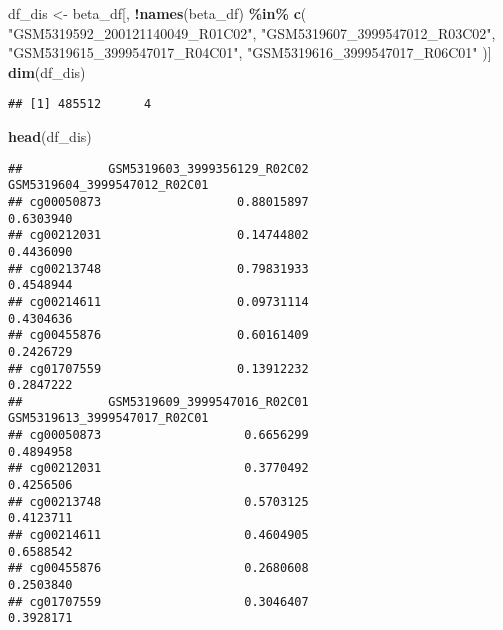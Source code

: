 \documentclass[
]{article}
\newenvironment{Shaded}{\begin{snugshade}}{\end{snugshade}}
\newcommand{\FunctionTok}[1]{\textcolor[rgb]{0.13,0.29,0.53}{\textbf{#1}}}
\newcommand{\NormalTok}[1]{#1}
\newcommand{\OtherTok}[1]{\textcolor[rgb]{0.56,0.35,0.01}{#1}}
\newcommand{\SpecialCharTok}[1]{\textcolor[rgb]{0.81,0.36,0.00}{\textbf{#1}}}
\newcommand{\StringTok}[1]{\textcolor[rgb]{0.31,0.60,0.02}{#1}}
\begin{document}
\begin{Shaded}
\begin{Highlighting}[]
\NormalTok{df\_dis }\OtherTok{\textless{}{-}}\NormalTok{ beta\_df[, }\SpecialCharTok{!}\FunctionTok{names}\NormalTok{(beta\_df) }\SpecialCharTok{\%in\%} \FunctionTok{c}\NormalTok{(}
  \StringTok{"GSM5319592\_200121140049\_R01C02"}\NormalTok{,}
  \StringTok{"GSM5319607\_3999547012\_R03C02"}\NormalTok{,}
  \StringTok{"GSM5319615\_3999547017\_R04C01"}\NormalTok{,}
  \StringTok{"GSM5319616\_3999547017\_R06C01"}
\NormalTok{)]}
\FunctionTok{dim}\NormalTok{(df\_dis)}
\end{Highlighting}
\end{Shaded}

\begin{verbatim}
## [1] 485512      4
\end{verbatim}

\begin{Shaded}
\begin{Highlighting}[]
\FunctionTok{head}\NormalTok{(df\_dis)}
\end{Highlighting}
\end{Shaded}

\begin{verbatim}
##            GSM5319603_3999356129_R02C02 GSM5319604_3999547012_R02C01
## cg00050873                   0.88015897                    0.6303940
## cg00212031                   0.14744802                    0.4436090
## cg00213748                   0.79831933                    0.4548944
## cg00214611                   0.09731114                    0.4304636
## cg00455876                   0.60161409                    0.2426729
## cg01707559                   0.13912232                    0.2847222
##            GSM5319609_3999547016_R02C01 GSM5319613_3999547017_R02C01
## cg00050873                    0.6656299                    0.4894958
## cg00212031                    0.3770492                    0.4256506
## cg00213748                    0.5703125                    0.4123711
## cg00214611                    0.4604905                    0.6588542
## cg00455876                    0.2680608                    0.2503840
## cg01707559                    0.3046407                    0.3928171
\end{verbatim}
\end{document}
